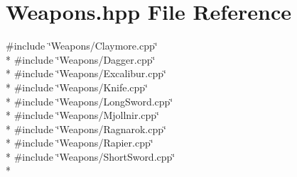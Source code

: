 \section{Weapons.\-hpp File Reference}
\label{_weapons_8hpp}
{\ttfamily \#include \char`\"{}Weapons/\-Claymore.\-cpp\char`\"{}}\\*
{\ttfamily \#include \char`\"{}Weapons/\-Dagger.\-cpp\char`\"{}}\\*
{\ttfamily \#include \char`\"{}Weapons/\-Excalibur.\-cpp\char`\"{}}\\*
{\ttfamily \#include \char`\"{}Weapons/\-Knife.\-cpp\char`\"{}}\\*
{\ttfamily \#include \char`\"{}Weapons/\-Long\-Sword.\-cpp\char`\"{}}\\*
{\ttfamily \#include \char`\"{}Weapons/\-Mjollnir.\-cpp\char`\"{}}\\*
{\ttfamily \#include \char`\"{}Weapons/\-Ragnarok.\-cpp\char`\"{}}\\*
{\ttfamily \#include \char`\"{}Weapons/\-Rapier.\-cpp\char`\"{}}\\*
{\ttfamily \#include \char`\"{}Weapons/\-Short\-Sword.\-cpp\char`\"{}}\\*

